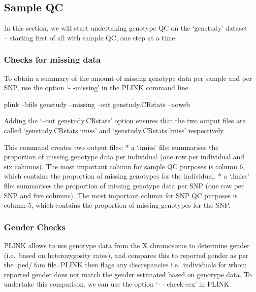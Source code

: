 \documentclass[]{book}
\newenvironment{Shaded}{\begin{snugshade}}{\end{snugshade}}
\newcommand{\ExtensionTok}[1]{#1}
\newcommand{\NormalTok}[1]{#1}
\begin{document}
\subsection{Sample QC}\label{sample-qc}

In this section, we will start undertaking genotype QC on the `genstudy'
dataset -- starting first of all with sample QC, one step at a time.

\subsubsection{Checks for missing data}\label{checks-for-missing-data}

To obtain a summary of the amount of missing genotype data per sample
and per SNP, use the option `- -missing' in the PLINK command line.

\begin{Shaded}
\begin{Highlighting}[]
\ExtensionTok{plink}\NormalTok{ --bfile genstudy --missing --out genstudy.CRstats --noweb}
\end{Highlighting}
\end{Shaded}

Adding the `--out genstudy.CRstats' option ensures that the two output
files are called `genstudy.CRstats.imiss' and `genstudy.CRstats.lmiss'
respectively.

This command creates two output files: * a `.imiss' file: summarises the
proportion of missing genotype data per individual (one row per
individual and six columns). The most important column for sample QC
purposes is column 6, which contains the proportion of missing genotypes
for the individual. * a `.lmiss' file: summarises the proportion of
missing genotype data per SNP (one row per SNP and five columns). The
most important column for SNP QC purposes is column 5, which contains
the proportion of missing genotypes for the SNP.

\subsubsection{Gender Checks}\label{gender-checks}

PLINK allows to use genotype data from the X chromosome to determine
gender (i.e.~based on heterozygosity rates), and compares this to
reported gender as per the .ped/.fam file. PLINK then flags any
discrepancies i.e.~individuals for whom reported gender does not match
the gender estimated based on genotype data. To undertake this
comparison, we can use the option `- - check-sex' in PLINK.
\end{document}
